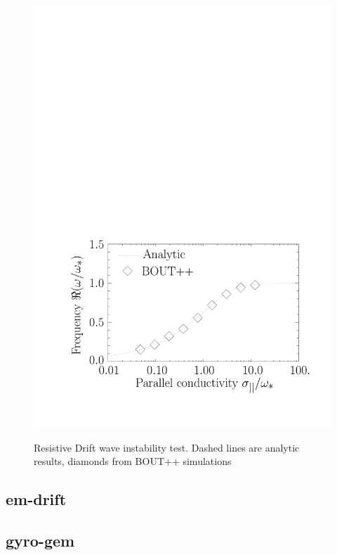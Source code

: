 \documentclass[12pt]{article}
\begin{document}
\begin{figure}[htbp!]
{  \includegraphics[scale=0.35]{figs/drift_freq.pdf} }
\caption{Resistive Drift wave instability test. Dashed lines are analytic results, diamonds from BOUT++ simulations}
%
\label{fig:drift_test}
%
\end{figure}
%



\subsection{em-drift}
%



\subsection{gyro-gem}
%
\end{document}
